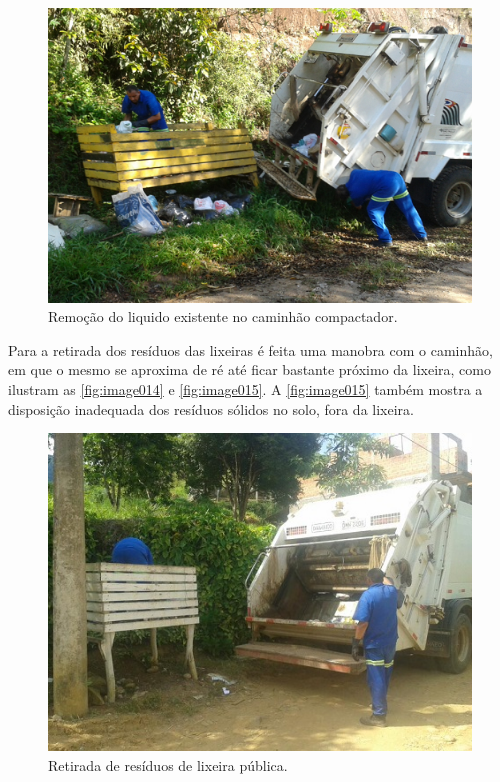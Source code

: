 	\begin{figure}
		\centering
		\includegraphics[width=0.7\linewidth]{produtos/prodtres/image013}
		\caption{Remoção do liquido existente no caminhão compactador.}
		\label{fig:image013}
	\end{figure}
	
	Para a retirada dos resíduos das lixeiras é feita uma manobra com o caminhão, em que o mesmo se aproxima de ré até ficar bastante próximo da lixeira, como ilustram as \autoref{fig:image014} e \autoref{fig:image015}. A \autoref{fig:image015} também mostra a disposição inadequada dos resíduos sólidos no solo, fora da lixeira.
	
	\begin{figure}
		\centering
		\includegraphics[width=0.7\linewidth]{produtos/prodtres/image014}
		\caption{Retirada de resíduos de lixeira pública.}
		\label{fig:image014}
	\end{figure}
	
